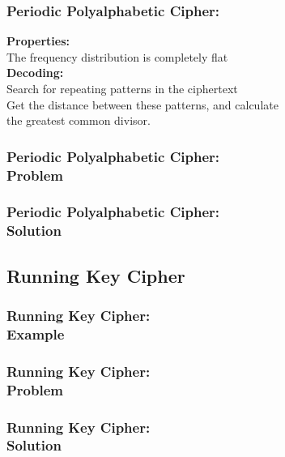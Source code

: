 \documentclass{uva-inf-presentation}
\begin{document}
\begin{frame}
\frametitle{Periodic Polyalphabetic Cipher:}
\textbf{Properties:}\\
\hspace{4ex}The frequency distribution is completely flat\\

\textbf{Decoding:}\\
\hspace{4ex}Search for repeating patterns in the ciphertext\\
\hspace{4ex}Get the distance between these patterns, and calculate\\
\hspace{4ex}the greatest common divisor.
\end{frame}

\begin{frame}
\frametitle{Periodic Polyalphabetic Cipher:\\ Problem}
\vspace{-30pt}

\end{frame}

\begin{frame}
\frametitle{Periodic Polyalphabetic Cipher:\\ Solution}
\end{frame}

\subsection{Running Key Cipher}
\frame{\tableofcontents[currentsubsection]}

\begin{frame}
\frametitle{Running Key Cipher:\\ Example}
\end{frame}

\begin{frame}
\frametitle{Running Key Cipher:\\ Problem}
\end{frame}

\begin{frame}
\frametitle{Running Key Cipher:\\ Solution}
\end{frame}
\end{document}
